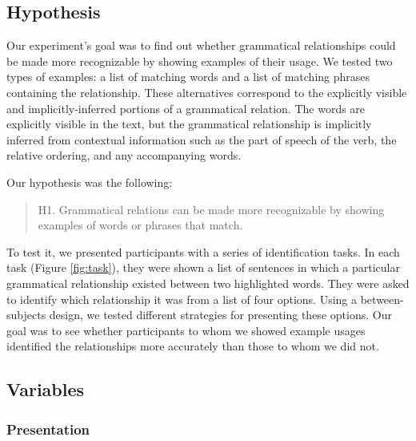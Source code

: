 \subsection{Hypothesis}
Our experiment's goal was to find out whether grammatical relationships could be made more recognizable by showing examples of their usage. We tested two types of examples: a list of matching words and a list of matching phrases containing the relationship. These alternatives correspond to the explicitly visible and implicitly-inferred portions of a grammatical relation. The words are explicitly visible in the text, but the grammatical relationship is implicitly inferred from contextual information such as the part of speech of the verb, the relative ordering, and any accompanying words.

Our hypothesis was the following:
\begin{quote}
	H1. Grammatical relations can be made more recognizable by showing examples of words or phrases that match.
\end{quote}


To test it, we presented participants with a series of identification tasks. In each task (Figure \ref{fig:task}), they were shown a list of sentences in which a particular grammatical relationship existed between two highlighted words. They were asked to identify which relationship it was from a list of four options.  Using a between-subjects design, we tested different strategies for presenting these options. Our goal was to see whether participants to whom we showed example usages identified the relationships more accurately than those to whom we did not.

\subsection{Variables}

\subsubsection{Presentation}

